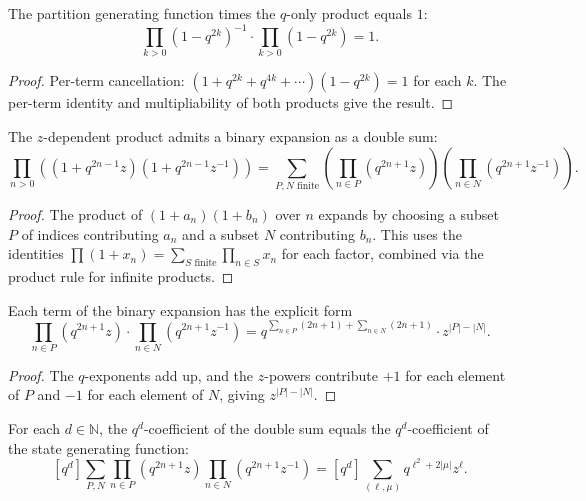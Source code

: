 \begin{lemma}
\label{lem.jtp.partitionGenFunJacobi-mul-QProduct}
\leanhelper
\leanok
The partition generating function times the $q$-only product equals $1$:
\[
\prod_{k>0}(1-q^{2k})^{-1} \cdot \prod_{k>0}(1-q^{2k}) = 1.
\]
\end{lemma}

\begin{proof}
\leanok
Per-term cancellation: $(1 + q^{2k} + q^{4k} + \cdots)(1 - q^{2k}) = 1$ for each $k$.
The per-term identity and multipliability of both products give the result.
\end{proof}

\begin{lemma}
\label{lem.jtp.jacobiZZProduct-eq-double-tsum}
\leanhelper
\leanok
The $z$-dependent product admits a binary expansion as a double sum:
\[
\prod_{n>0}((1+q^{2n-1}z)(1+q^{2n-1}z^{-1}))
= \sum_{P,N \text{ finite}} \left(\prod_{n\in P}(q^{2n+1}z)\right)\left(\prod_{n\in N}(q^{2n+1}z^{-1})\right).
\]
\end{lemma}

\begin{proof}
The product of $(1+a_n)(1+b_n)$ over $n$ expands by choosing a subset $P$ of indices
contributing $a_n$ and a subset $N$ contributing $b_n$. This uses the identities
$\prod(1+x_n) = \sum_{S\text{ finite}} \prod_{n\in S} x_n$ for each factor,
combined via the product rule for infinite products.
\end{proof}

\begin{lemma}
\label{lem.jtp.double-sum-term-explicit}
\leanhelper
\leanok
Each term of the binary expansion has the explicit form
\[
\prod_{n\in P}(q^{2n+1}z) \cdot \prod_{n\in N}(q^{2n+1}z^{-1})
= q^{\sum_{n\in P}(2n+1) + \sum_{n\in N}(2n+1)} \cdot z^{|P| - |N|}.
\]
\end{lemma}

\begin{proof}
The $q$-exponents add up, and the $z$-powers contribute $+1$ for each element of $P$
and $-1$ for each element of $N$, giving $z^{|P|-|N|}$.
\end{proof}

\begin{lemma}
\label{lem.jtp.coeff-double-sum-eq-coeff-stateGenFun}
\leanhelper
\leanok
For each $d\in\mathbb{N}$, the $q^d$-coefficient of the double sum
equals the $q^d$-coefficient of the state generating function:
\[
[q^d]\sum_{P,N}\prod_{n\in P}(q^{2n+1}z)\prod_{n\in N}(q^{2n+1}z^{-1})
= [q^d]\sum_{(\ell,\mu)} q^{\ell^2+2|\mu|}z^\ell.
\]
\end{lemma}

